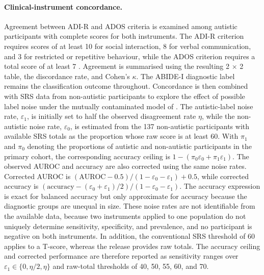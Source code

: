 \paragraph{\textbf{Clinical-instrument concordance.}}
\label{par:instrument-concordance}
Agreement between ADI-R and ADOS criteria is examined among autistic participants with complete scores for both instruments. The ADI-R criterion requires scores of at least 10 for social interaction, 8 for verbal communication, and 3 for restricted or repetitive behaviour, while the ADOS criterion requires a total score of at least 7 \citep{Lordetal1994}. Agreement is summarised using the resulting 2 $\times$ 2 table, the discordance rate, and Cohen's $\kappa$. The ABIDE-I diagnostic label remains the classification outcome throughout. Concordance is then combined with SRS data from non-autistic participants to explore the effect of possible label noise under the mutually contaminated model of \citet{Menonetal2015}. The autistic-label noise rate, $\varepsilon_1$, is initially set to half the observed disagreement rate $\eta$, while the non-autistic noise rate, $\varepsilon_0$, is estimated from the 137 non-autistic participants with available SRS totals as the proportion whose raw score is at least 60. With $\pi_1$ and $\pi_0$ denoting the proportions of autistic and non-autistic participants in the primary cohort, the corresponding accuracy ceiling is $1-(\pi_0\varepsilon_0+\pi_1\varepsilon_1)$. The observed AUROC and accuracy are also corrected using the same noise rates. Corrected AUROC is $(\mathrm{AUROC}-0.5)/(1-\varepsilon_0-\varepsilon_1)+0.5$, while corrected accuracy is $(\mathrm{accuracy}-(\varepsilon_0+\varepsilon_1)/2)/(1-\varepsilon_0-\varepsilon_1)$. The accuracy expression is exact for balanced accuracy but only approximate for accuracy because the diagnostic groups are unequal in size. These noise rates are not identifiable from the available data, because two instruments applied to one population do not uniquely determine sensitivity, specificity, and prevalence, and no participant is negative on both instruments. In addition, the conventional SRS threshold of 60 applies to a T-score, whereas the release provides raw totals. The accuracy ceiling and corrected performance are therefore reported as sensitivity ranges over $\varepsilon_1\in\{0,\eta/2,\eta\}$ and raw-total thresholds of 40, 50, 55, 60, and 70.

